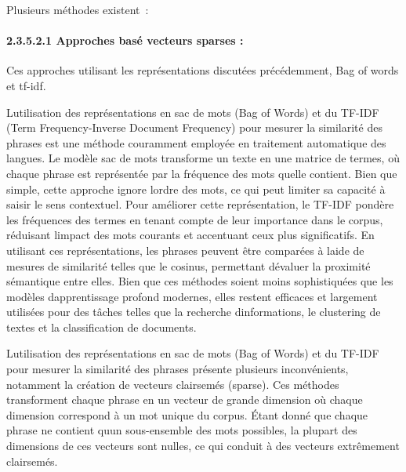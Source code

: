 \documentclass[
]{article}
\begin{document}
Plusieurs méthodes existent~:

\paragraph{2.3.5.2.1 Approches basé vecteurs sparses
:}\label{approches-basuxe9-vecteurs-sparses}

Ces approches utilisant les représentations discutées précédemment, Bag
of words et tf-idf.

L\textquotesingle utilisation des représentations en sac de mots (Bag of
Words) et du TF-IDF (Term Frequency-Inverse Document Frequency) pour
mesurer la similarité des phrases est une méthode couramment employée en
traitement automatique des langues. Le modèle sac de mots transforme un
texte en une matrice de termes, où chaque phrase est représentée par la
fréquence des mots qu\textquotesingle elle contient. Bien que simple,
cette approche ignore l\textquotesingle ordre des mots, ce qui peut
limiter sa capacité à saisir le sens contextuel. Pour améliorer cette
représentation, le TF-IDF pondère les fréquences des termes en tenant
compte de leur importance dans le corpus, réduisant
l\textquotesingle impact des mots courants et accentuant ceux plus
significatifs. En utilisant ces représentations, les phrases peuvent
être comparées à l\textquotesingle aide de mesures de similarité telles
que le cosinus, permettant d\textquotesingle évaluer la proximité
sémantique entre elles. Bien que ces méthodes soient moins sophistiquées
que les modèles d\textquotesingle apprentissage profond modernes, elles
restent efficaces et largement utilisées pour des tâches telles que la
recherche d\textquotesingle informations, le clustering de textes et la
classification de documents.

L\textquotesingle utilisation des représentations en sac de mots (Bag of
Words) et du TF-IDF pour mesurer la similarité des phrases présente
plusieurs inconvénients, notamment la création de vecteurs clairsemés
(sparse). Ces méthodes transforment chaque phrase en un vecteur de
grande dimension où chaque dimension correspond à un mot unique du
corpus. Étant donné que chaque phrase ne contient qu\textquotesingle un
sous-ensemble des mots possibles, la plupart des dimensions de ces
vecteurs sont nulles, ce qui conduit à des vecteurs extrêmement
clairsemés.
\end{document}
